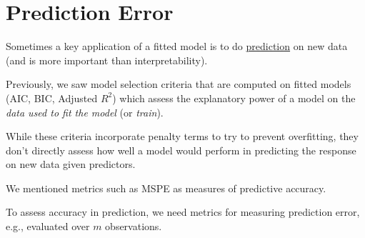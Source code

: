 \section{Prediction Error}
Sometimes a key application of a fitted model
is to do \underline{prediction} on new data
(and is more important than interpretability).

Previously, we saw model selection criteria
that are computed on fitted models
(AIC, BIC, Adjusted $ R^2 $) which assess
the explanatory
power of a model on the \emph{data used to fit the model}
(or \emph{train}).

While these criteria incorporate penalty terms to try
to prevent overfitting, they don't directly assess
how well a model would perform in predicting the response
on new data given predictors.

We mentioned metrics such as MSPE as measures of predictive
accuracy.

To assess accuracy in prediction, we need metrics for
measuring prediction error, e.g., evaluated
over $ m $ observations.

